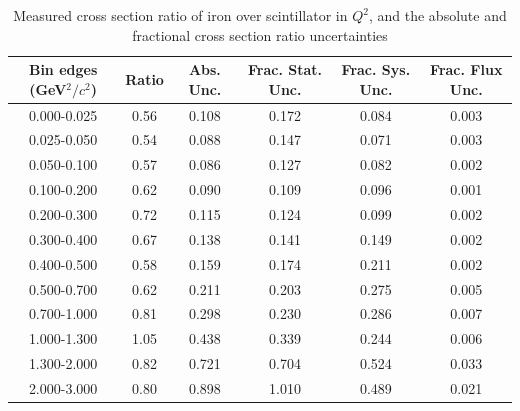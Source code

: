 \documentclass[../main.tex]{subfiles}
\begin{document}
\begin{table}
  \centering
  \renewcommand{\arraystretch}{1.15}
  \caption{Measured cross section ratio of iron over scintillator in $Q^2$, and the absolute and fractional cross section ratio uncertainties}
    \begin{tabular}{c||c|c||c|c|c}
      Bin edges (GeV${}^2/c{}^2$) &  Ratio  &  Abs. Unc.  &  Frac. Stat. Unc.  &  Frac. Sys. Unc.  &  Frac. Flux Unc. \\
      \hline
      \hline
      0.000-0.025 & 0.56 & 0.108 & 0.172 & 0.084 & 0.003\\
      0.025-0.050 & 0.54 & 0.088 & 0.147 & 0.071 & 0.003\\
      0.050-0.100 & 0.57 & 0.086 & 0.127 & 0.082 & 0.002\\
      0.100-0.200 & 0.62 & 0.090 & 0.109 & 0.096 & 0.001\\
      0.200-0.300 & 0.72 & 0.115 & 0.124 & 0.099 & 0.002\\
      0.300-0.400 & 0.67 & 0.138 & 0.141 & 0.149 & 0.002\\
      0.400-0.500 & 0.58 & 0.159 & 0.174 & 0.211 & 0.002\\
      0.500-0.700 & 0.62 & 0.211 & 0.203 & 0.275 & 0.005\\
      0.700-1.000 & 0.81 & 0.298 & 0.230 & 0.286 & 0.007\\
      1.000-1.300 & 1.05 & 0.438 & 0.339 & 0.244 & 0.006\\
      1.300-2.000 & 0.82 & 0.721 & 0.704 & 0.524 & 0.033\\
      2.000-3.000 & 0.80 & 0.898 & 1.010 & 0.489 & 0.021
    \end{tabular}
  \label{tbl:rationucleonnuc26q2a}
\end{table}
\pagebreak
\end{document}
